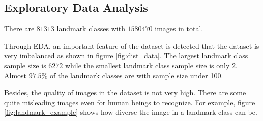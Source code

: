 \documentclass[10pt,twocolumn,letterpaper]{article}
\begin{document}
\subsection{Exploratory Data Analysis}
There are $81313$ landmark classes with $1580470$ images in total.

Through EDA, an important feature of the dataset is detected that the dataset is very imbalanced as shown in figure \ref{fig:dist_data}. The largest landmark class sample size is $6272$ while the smallest landmark class sample size is only $2$. Almost $97.5\%$ of the landmark classes are with sample size under 100.  

Besides, the quality of images in the dataset is not very high. There are some quite misleading images even for human beings to recognize. For example, figure \ref{fig:landmark_example} shows how diverse the image in a landmark class can be. 
\end{document}
